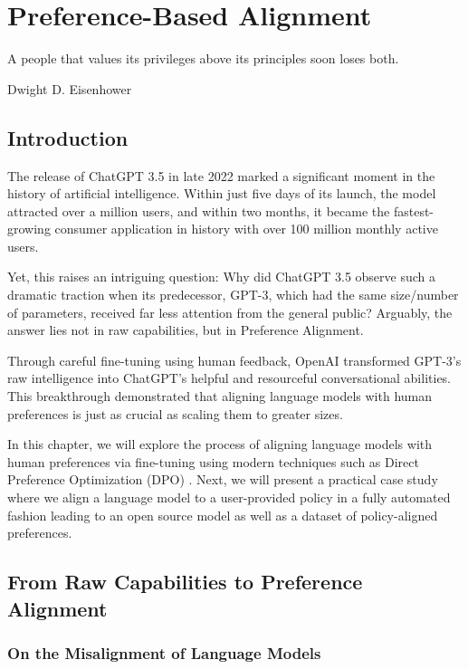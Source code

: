 \chapter{Preference-Based Alignment}
\label{chapter:alignment}
\setchapterpreamble[u]{\margintoc}

\epigraph{A people that values its privileges above its principles soon loses both.}{Dwight D. Eisenhower}

\section{Introduction}

The release of ChatGPT 3.5 in late 2022 marked a significant moment in the history of artificial intelligence. Within just five days of its launch, the model attracted over a million users, and within two months, it became the fastest-growing consumer application in history with over 100 million monthly active users.

Yet, this raises an intriguing question: Why did ChatGPT 3.5 observe such a dramatic traction when its predecessor, GPT-3, which had the same size/number of parameters, received far less attention from the general public? Arguably, the answer lies not in raw capabilities, but in Preference Alignment. 

Through careful fine-tuning using human feedback, OpenAI transformed GPT-3's raw intelligence into ChatGPT's helpful and resourceful conversational abilities. This breakthrough demonstrated that aligning language models with human preferences is just as crucial as scaling them to greater sizes.

In this chapter, we will explore the process of aligning language models with human preferences via fine-tuning using modern techniques such as Direct Preference Optimization (DPO) . Next, we will present a practical case study where we align a language model to a user-provided policy in a fully automated fashion leading to an open source model as well as a dataset of policy-aligned preferences.
\section{From Raw Capabilities to Preference Alignment}

\subsection{On the Misalignment of Language Models}

